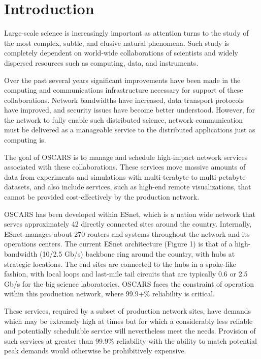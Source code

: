 \documentclass[conference]{IEEEtran}
\begin{document}
\section{Introduction}
Large-scale science is increasingly important as attention turns to the
study of the most complex, subtle, and elusive natural phenomena.  Such
study is completely dependent on world-wide collaborations of scientists
and widely dispersed resources such as computing, data, and instruments.

Over the past several years significant improvements have been made in the
computing and communications infrastructure necessary for support of these
collaborations.  Network bandwidths have increased, data transport protocols
have improved, and security issues have become better understood.  However,
for the network to fully enable such distributed science, network
communication must be delivered as a manageable service to the distributed
applications just as computing is.

The goal of OSCARS is to manage and schedule high-impact network services
associated with these collaborations.  These services
move massive amounts of data from experiments and 
simulations with multi-terabyte to multi-petabyte datasets, and also include
services, such as high-end remote visualizations,
that cannot be provided cost-effectively by the production network.

OSCARS has been developed within ESnet,
which is a nation wide network that serves approximately 42 directly connected 
sites around the country.  Internally, ESnet manages about 270 routers and 
systems throughout the network and its operations centers.  The current ESnet 
architecture (Figure 1) is that of a high-bandwidth (10/2.5 Gb/s) backbone ring 
around the country, with hubs at strategic locations.  The end sites are 
connected to the hubs in a spoke-like fashion, with local loops and last-mile 
tail circuits that are typically 0.6 or 2.5 Gb/s for the big science 
laboratories.  OSCARS faces the constraint of operation within this production 
network, where 99.9+\% reliability is critical.

These services, required by a subset of production network sites, have demands 
which may be extremely high at times but for which a considerably less reliable 
and potentially schedulable service will nevertheless meet the needs.  Provision
of such services at greater than 99.9\% reliability with the ability to 
match potential peak demands would otherwise be prohibitively expensive.
\end{document}
